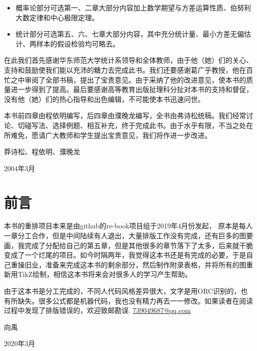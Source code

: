 \begin{itemize}
  \item 概率论部分可选第一、二章大部分内容加上数学期望与方差运算性质、伯努利大数定律和中心极限定理。
  \item 统计部分可选第五、六、七章大部分内容，其中充分统计量、最小方差无偏估计、两样本的假设检验均可略去。
\end{itemize}

在此我们首先感谢华东师范大学统计系领导和全体教师，由于他（她）们的关心、支持和鼓励使我们能以充沛的糖力去完成此书。我们还要感谢葛广乎教授，他在百忙之中审阅了全部书稿，提出了宝贵意见。由于采纳了他的改进意见，使本书的质量进一步得到了提高。最后要感谢高等教育出版扯理科分扯对本书的支持和督促，没有他（她）们的热心指导和出色编辑，不可能使本书迅速问世。

本书前四章由程依明编写，后四章由濮晚龙编写，全书由弗诗松统稿。我们经常讨论、切碰写法、选择例题、相互补充，终于完成此书。由于水乎有限，不当之处在所难免，愿请广大教师和学生提出宝贵意见，我们将作进一步改进。

\hfill 莽诗松、程依明、濮晚龙

\hfill 2004年3月 \hspace{0.8cm}

\chapter*{前言}
本书的重排项目本来是由github的re-book项目组于2019年4月份发起， 原本是每人一章分工合作，但是中间陆续有人退出，大量排版工作没有完成，还有巨多的图要画，我完成了分配给自己的第五章，但是其他很多的章节落下了太多，后来就干脆变成了一个烂尾的项目。如今时隔两年，我觉得这本书还是有完成的必要，于是自己重操旧业，准备来完成这本书的剩余部分，然后制作附录表格，并将所有的图重新用TikZ绘制，相信这本书将来会对很多人的学习产生帮助。

由于这本书是分工完成的，不同人代码风格差异很大，文字是用ORC识别的，也有所缺失。很多公式都是机器代码，我也没有精力再去一一修改。如果读者在阅读过程中发现了排版错误的，欢迎致邮勘误. \href{739049687@qq.com}{739049687@qq.com}

\hfill 向禹\hspace{2em}

\hfill 2020年3月

